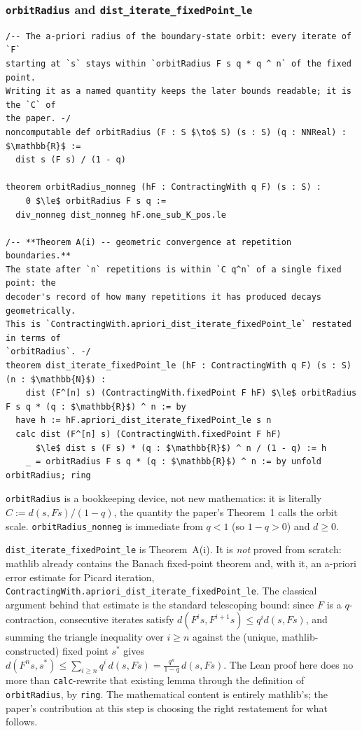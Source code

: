 \documentclass[11pt]{article}
\begin{document}
\subsubsection*{\texttt{orbitRadius} and \texttt{dist\_iterate\_fixedPoint\_le}}

\begin{lstlisting}
/-- The a-priori radius of the boundary-state orbit: every iterate of `F`
starting at `s` stays within `orbitRadius F s q * q ^ n` of the fixed point.
Writing it as a named quantity keeps the later bounds readable; it is the `C` of
the paper. -/
noncomputable def orbitRadius (F : S $\to$ S) (s : S) (q : NNReal) : $\mathbb{R}$ :=
  dist s (F s) / (1 - q)

theorem orbitRadius_nonneg (hF : ContractingWith q F) (s : S) :
    0 $\le$ orbitRadius F s q :=
  div_nonneg dist_nonneg hF.one_sub_K_pos.le

/-- **Theorem A(i) -- geometric convergence at repetition boundaries.**
The state after `n` repetitions is within `C q^n` of a single fixed point: the
decoder's record of how many repetitions it has produced decays geometrically.
This is `ContractingWith.apriori_dist_iterate_fixedPoint_le` restated in terms of
`orbitRadius`. -/
theorem dist_iterate_fixedPoint_le (hF : ContractingWith q F) (s : S) (n : $\mathbb{N}$) :
    dist (F^[n] s) (ContractingWith.fixedPoint F hF) $\le$ orbitRadius F s q * (q : $\mathbb{R}$) ^ n := by
  have h := hF.apriori_dist_iterate_fixedPoint_le s n
  calc dist (F^[n] s) (ContractingWith.fixedPoint F hF)
      $\le$ dist s (F s) * (q : $\mathbb{R}$) ^ n / (1 - q) := h
    _ = orbitRadius F s q * (q : $\mathbb{R}$) ^ n := by unfold orbitRadius; ring
\end{lstlisting}

\texttt{orbitRadius} is a bookkeeping device, not new mathematics: it is
literally $C := d(s, Fs)/(1-q)$, the quantity the paper's Theorem~1 calls the
orbit scale. \texttt{orbitRadius\_nonneg} is immediate from $q<1$ (so
$1-q>0$) and $d\ge 0$.

\texttt{dist\_iterate\_fixedPoint\_le} is Theorem~A(i). It is \emph{not}
proved from scratch: mathlib already contains the Banach fixed-point theorem
and, with it, an a-priori error estimate for Picard iteration,
\texttt{ContractingWith.apriori\_dist\_iterate\_fixedPoint\_le}. The classical
argument behind that estimate is the standard telescoping bound: since $F$ is
a $q$-contraction, consecutive iterates satisfy $d(F^i s, F^{i+1}s) \le q^i
d(s,Fs)$, and summing the triangle inequality over $i \ge n$ against the
(unique, mathlib-constructed) fixed point $s^\ast$ gives
$d(F^n s, s^\ast) \le \sum_{i \ge n} q^i\, d(s,Fs) = \frac{q^n}{1-q}\,d(s,Fs)$.
The Lean proof here does no more than \texttt{calc}-rewrite that existing
lemma through the definition of \texttt{orbitRadius}, by \texttt{ring}. The
mathematical content is entirely mathlib's; the paper's contribution at this
step is choosing the right restatement for what follows.
\end{document}
